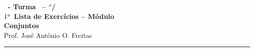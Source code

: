 \documentclass[12pt]{exam}
\begin{document}
    \begin{center}
    {\Large\bf \disciplina\ - Turma \turma\ -- \semestre$^{o}$/\ano} \\ \vspace{9pt} {\large\bf
        $1^a$ Lista de Exercícios -- Módulo \numeromodulo\\ Conjuntos}\\ \vspace{9pt} Prof. José Antônio O. Freitas
    \end{center}
    \hrule

    \vspace{.6cm}
\end{document}
